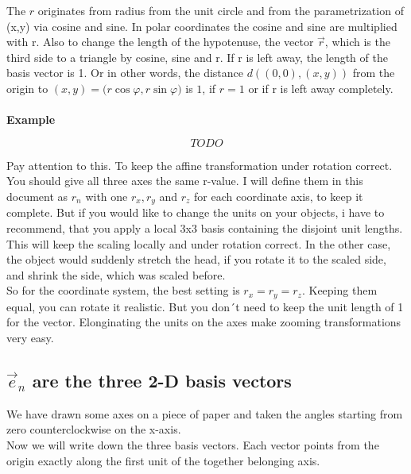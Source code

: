 \documentclass[a4paper]{article}
\begin{document}
The $r$ originates from radius from the unit circle and from the parametrization of (x,y) via cosine and sine. 
In polar coordinates the cosine and sine are multiplied with r. Also to change the length of the hypotenuse, 
the vector $\vec{r}$, which is the third side to a triangle by cosine, sine and r. 
If r is left away, the length of the basis vector is 1. Or in other words, the distance $d((0,0),(x,y))$ from the origin to $(x,y)=($$r \cos \varphi$$, $$r \sin \varphi$$)$ is $1$, if $r=1$ or if r is left away completely.\\

\\

\textbf{Example}
\begin{Example}
\begin{displaymath}
TODO
\end{displaymath}

Pay attention to this. To keep the affine transformation under rotation correct. You should give all three
axes the same r-value. I will define them in this document as $r_{n}$ with one $r_x, r_y$ and $r_z$ for each coordinate axis,
to keep it complete. But if you would like to change the units on your objects, i have to recommend, that you apply a local
3x3 basis containing the disjoint unit lengths. This will keep the scaling locally and under rotation correct.
In the other case, the object would suddenly stretch the head, if you rotate it to the scaled side, and shrink the side, 
which was scaled before.\\

So for the coordinate system, the best setting is $r_x = r_y = r_z$. Keeping them equal, you can rotate it realistic. But you
don´t need to keep the unit length of 1 for the vector. Elonginating the units on the axes make zooming transformations very
easy.\\

\subsection{$\vec{e}_{n}$ are the three 2-D basis vectors}

We have drawn some axes on a piece of paper and taken the angles starting from zero counterclockwise on the x-axis.\\

Now we will write down the three basis vectors. Each vector points from the origin exactly along the first unit of the together belonging axis.\\


\end{Example}
\end{document}
